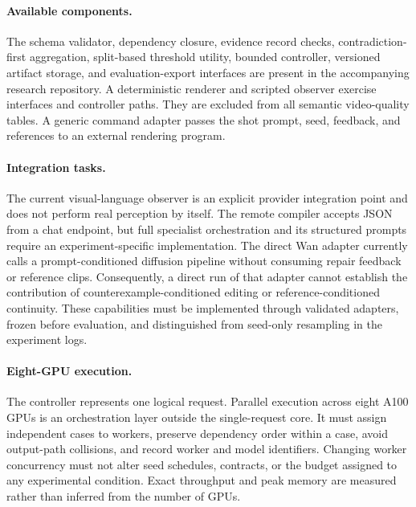 \paragraph{Available components.}
The schema validator, dependency closure, evidence record checks,
contradiction-first aggregation, split-based threshold utility, bounded
controller, versioned artifact storage, and evaluation-export interfaces
are present in the accompanying research repository. A deterministic
renderer and scripted observer exercise interfaces and controller paths.
They are excluded from all semantic video-quality tables. A generic command
adapter passes the shot prompt, seed, feedback, and references to an external
rendering program.

\paragraph{Integration tasks.}
The current visual-language observer is an explicit provider integration
point and does not perform real perception by itself. The remote compiler
accepts JSON from a chat endpoint, but full specialist orchestration and its
structured prompts require an experiment-specific implementation. The direct
Wan adapter currently calls a prompt-conditioned diffusion pipeline without
consuming repair feedback or reference clips. Consequently, a direct run of
that adapter cannot establish the contribution of counterexample-conditioned
editing or reference-conditioned continuity. These capabilities must be
implemented through validated adapters, frozen before evaluation, and
distinguished from seed-only resampling in the experiment logs.

\paragraph{Eight-GPU execution.}
The controller represents one logical request. Parallel execution across
eight A100 GPUs is an orchestration layer outside the single-request core.
It must assign independent cases to workers, preserve dependency order
within a case, avoid output-path collisions, and record worker and model
identifiers. Changing worker concurrency must not alter seed schedules,
contracts, or the budget assigned to any experimental condition. Exact
throughput and peak memory are measured rather than inferred from the number
of GPUs.
